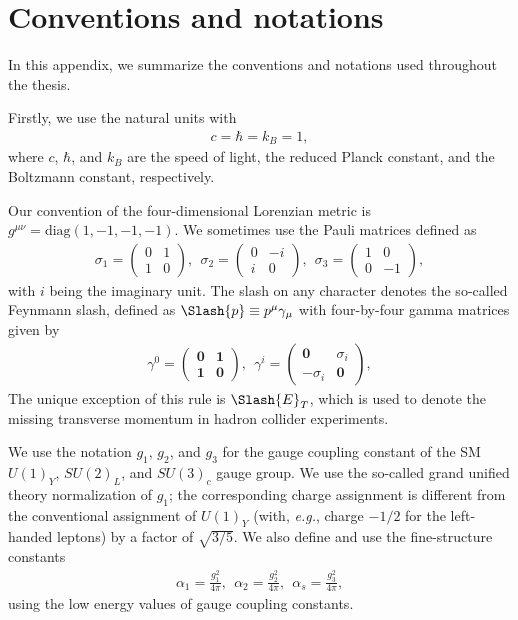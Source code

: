 \documentclass[12pt,twoside,book]{article}
\begin{document}
\section{Conventions and notations}
\label{sec:convention}

\vskip 0.1in

In this appendix, we summarize the conventions and notations used throughout the thesis.

Firstly, we use the natural units with
\begin{align}
  c = \hbar = k_B = 1,
\end{align}
where $c$, $\hbar$, and $k_B$ are the speed of light, the reduced Planck constant, and the Boltzmann constant, respectively.

Our convention of the four-dimensional Lorenzian metric is $g^{\mu \nu} = \mathrm{diag} (1, -1, -1, -1)$.
We sometimes use the Pauli matrices defined as
\begin{align}
  \sigma_1 =
  \begin{pmatrix}
    0 & 1\\
    1 & 0
  \end{pmatrix},
  ~~
  \sigma_2 =
  \begin{pmatrix}
    0 & -i\\
    i & 0
  \end{pmatrix},
  ~~
  \sigma_3 =
  \begin{pmatrix}
    1 & 0\\
    0 & -1
  \end{pmatrix},
\end{align}
with $i$ being the imaginary unit.
The slash on any character denotes the so-called Feynmann slash, defined as $\Slash{p} \equiv p^\mu \gamma_\mu$ with four-by-four gamma matrices given by
\begin{align}
  \gamma^0 =
  \begin{pmatrix}
    \bm{0} & \bm{1}\\
    \bm{1} & \bm{0}
  \end{pmatrix},
  ~~
  \gamma^i =
  \begin{pmatrix}
    \bm{0} & \sigma_i\\
    -\sigma_i & \bm{0}
  \end{pmatrix},
\end{align}
The unique exception of this rule is $\Slash{E}_T$, which is used to denote the missing transverse momentum in hadron collider experiments.

We use the notation $g_1$, $g_2$, and $g_3$ for the gauge coupling constant of the SM $U(1)_Y$, $SU(2)_L$, and $SU(3)_c$ gauge group.
We use the so-called grand unified theory normalization of $g_1$; the corresponding charge assignment is different from the conventional assignment of $U(1)_Y$ (with, \textit{e.g.}, charge $-1/2$ for the left-handed leptons) by a factor of $\sqrt{3/5}$.
We also define and use the fine-structure constants
\begin{align}
  \alpha_1 = \frac{g_1^2}{4\pi},
  ~~
  \alpha_2 = \frac{g_2^2}{4\pi},
  ~~
  \alpha_s = \frac{g_3^2}{4\pi},
\end{align}
using the low energy values of gauge coupling constants.
\end{document}
